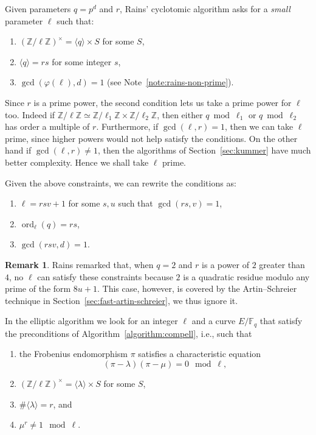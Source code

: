 \documentclass{mcom-l}
\theoremstyle{plain}
\theoremstyle{definition}
\newtheorem*{remark}{Remark}
\DeclareMathOperator{\order}{ord} %
\newcommand{\Z}{\ensuremath{\mathbb{Z}}}
\newcommand{\F}{\ensuremath{\mathbb{F}}}
\newcommand{\euler}{\ensuremath{\varphi}}
\newcounter{algorithm}
\begin{document}
Given parameters $q=p^d$ and $r$, Rains' cyclotomic algorithm asks for
a \emph{small} parameter $\ell$ such that:
\begin{enumerate}
\item $(\Z/\ell\Z)^\times = \langle q\rangle \times S$ for some $S$,
\item $\langle q \rangle = rs$ for some integer $s$,
\item $\gcd(\euler(\ell),d)=1$ (see Note~\ref{note:rains-non-prime}).
\end{enumerate}

Since $r$ is a prime power, the second condition lets us take a prime
power for $\ell$ too. Indeed if
$\Z/\ell\Z\simeq\Z/\ell_1\Z\times\Z/\ell_2\Z$, then either
$q\bmod\ell_1$ or $q\bmod\ell_2$ has order a multiple of $r$.
Furthermore, if $\gcd(\ell,r)=1$, then we can take $\ell$ prime, since
higher powers would not help satisfy the conditions. On the other hand
if $\gcd(\ell,r)\ne1$, then the algorithms of Section~\ref{sec:kummer} have much
better complexity. Hence we shall take $\ell$ prime.

Given the above constraints, we can rewrite the conditions as:
\begin{enumerate}
\item $\ell = rsv + 1$ for some $s,u$ such that $\gcd(rs,v)=1$,
\item $\order_\ell(q) = rs$,
\item $\gcd(rsv,d)=1$.
\end{enumerate}

\begin{remark}
  Rains remarked that, when $q=2$ and $r$ is a power of $2$ greater
  than $4$, no $\ell$ can satisfy these constraints because $2$ is a
  quadratic residue modulo any prime of the form $8u+1$. This case,
  however, is covered by the Artin--Schreier technique in
  Section~\ref{sec:fast-artin-schreier}, we thus ignore it.
\end{remark}

In the elliptic algorithm we look for an integer $\ell$ and a curve
$E/\F_q$ that satisfy the preconditions of
Algorithm~\ref{algorithm:compell}, i.e., such that 
\begin{enumerate}
\item the Frobenius endomorphism $\pi$ satisfies a characteristic
  equation \[(\pi-\lambda)(\pi-\mu) = 0 \mod \ell,\]
\item $(\Z/\ell\Z)^\times = \langle\lambda\rangle\times S$ for some $S$,
\item $\#\langle\lambda\rangle=r$, and
\item $\mu^r\ne1\mod\ell$.
\end{enumerate}
\end{document}
